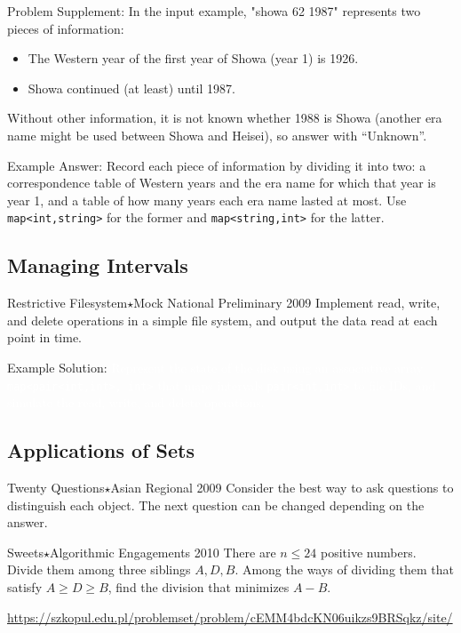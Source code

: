 Problem Supplement: In the input example, "showa 62 1987" represents two pieces of information:
\begin{itemize}
\setlength{\itemsep}{0pt}
\item The Western year of the first year of Showa (year 1) is 1926.
\item Showa continued (at least) until 1987.
\end{itemize}
Without other information, it is not known whether 1988 is Showa (another era name might be used between Showa and Heisei), so answer with ``Unknown''.

Example Answer: Record each piece of information by dividing it into two: a correspondence table of Western years and the era name for which that year is year 1, and a table of how many years each era name lasted at most.
Use \texttt{map<int,string>} for the former and \texttt{map<string,int>} for the latter.
\subsection{Managing Intervals}

\begin{pbox}{Restrictive Filesystem$\star$}{Mock National Preliminary 2009}
Implement read, write, and delete operations in a simple file system, and output the data read at each point in time.

\end{pbox}

Example Solution: \textcolor{white}{Represent the state of the disk using an associative array \texttt{map<pair<int,int>, int>} that maps intervals \texttt{pair<int,int>} to file IDs, and simulate the read, write, and delete operations.}
\subsection{Applications of Sets}

\begin{pbox}{Twenty Questions$\star$}{Asian Regional 2009}
Consider the best way to ask questions to distinguish each object. The next question can be changed depending on the answer.

\end{pbox}

\begin{pbox}{Sweets$\star$}{Algorithmic Engagements 2010}
There are $n \le 24$ positive numbers. Divide them among three siblings $A, D, B$. Among the ways of dividing them that satisfy $A \ge D \ge B$, find the division that minimizes $A-B$.

\url{https://szkopul.edu.pl/problemset/problem/cEMM4bdcKN06uikzs9BRSqkz/site/}
\end{pbox}

